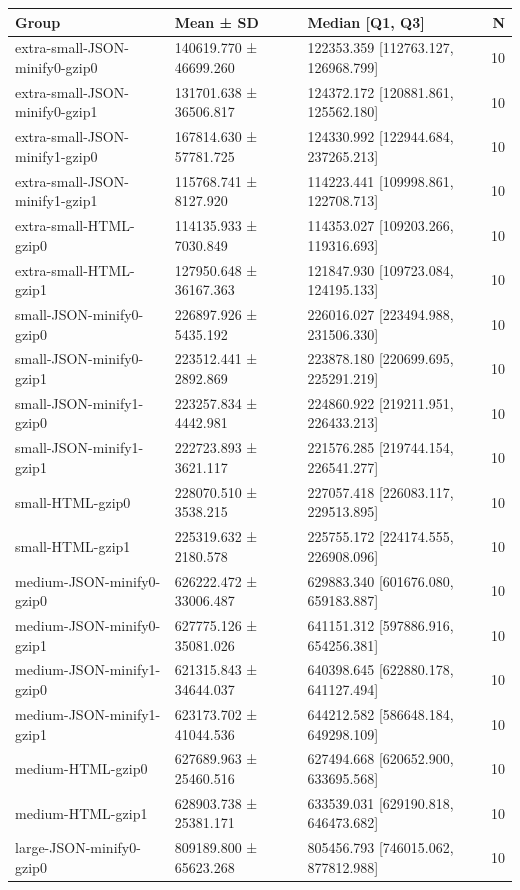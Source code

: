 \begin{tabular}{lllr}
\toprule
Group & Mean ± SD & Median [Q1, Q3] & N \\
\midrule
extra-small-JSON-minify0-gzip0 & 140619.770 ± 46699.260 & 122353.359 [112763.127, 126968.799] & 10 \\
extra-small-JSON-minify0-gzip1 & 131701.638 ± 36506.817 & 124372.172 [120881.861, 125562.180] & 10 \\
extra-small-JSON-minify1-gzip0 & 167814.630 ± 57781.725 & 124330.992 [122944.684, 237265.213] & 10 \\
extra-small-JSON-minify1-gzip1 & 115768.741 ± 8127.920 & 114223.441 [109998.861, 122708.713] & 10 \\
extra-small-HTML-gzip0 & 114135.933 ± 7030.849 & 114353.027 [109203.266, 119316.693] & 10 \\
extra-small-HTML-gzip1 & 127950.648 ± 36167.363 & 121847.930 [109723.084, 124195.133] & 10 \\
small-JSON-minify0-gzip0 & 226897.926 ± 5435.192 & 226016.027 [223494.988, 231506.330] & 10 \\
small-JSON-minify0-gzip1 & 223512.441 ± 2892.869 & 223878.180 [220699.695, 225291.219] & 10 \\
small-JSON-minify1-gzip0 & 223257.834 ± 4442.981 & 224860.922 [219211.951, 226433.213] & 10 \\
small-JSON-minify1-gzip1 & 222723.893 ± 3621.117 & 221576.285 [219744.154, 226541.277] & 10 \\
small-HTML-gzip0 & 228070.510 ± 3538.215 & 227057.418 [226083.117, 229513.895] & 10 \\
small-HTML-gzip1 & 225319.632 ± 2180.578 & 225755.172 [224174.555, 226908.096] & 10 \\
medium-JSON-minify0-gzip0 & 626222.472 ± 33006.487 & 629883.340 [601676.080, 659183.887] & 10 \\
medium-JSON-minify0-gzip1 & 627775.126 ± 35081.026 & 641151.312 [597886.916, 654256.381] & 10 \\
medium-JSON-minify1-gzip0 & 621315.843 ± 34644.037 & 640398.645 [622880.178, 641127.494] & 10 \\
medium-JSON-minify1-gzip1 & 623173.702 ± 41044.536 & 644212.582 [586648.184, 649298.109] & 10 \\
medium-HTML-gzip0 & 627689.963 ± 25460.516 & 627494.668 [620652.900, 633695.568] & 10 \\
medium-HTML-gzip1 & 628903.738 ± 25381.171 & 633539.031 [629190.818, 646473.682] & 10 \\
large-JSON-minify0-gzip0 & 809189.800 ± 65623.268 & 805456.793 [746015.062, 877812.988] & 10 \\

\end{tabular}
